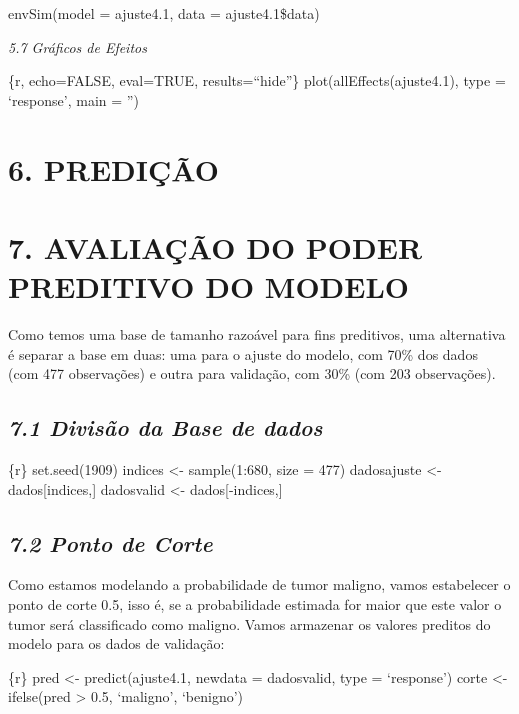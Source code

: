 \documentclass[]{article}
\begin{document}
envSim(model = ajuste4.1, data = ajuste4.1\$data)

\emph{5.7 Gráficos de Efeitos}

\{r, echo=FALSE, eval=TRUE, results=``hide''\}
plot(allEffects(ajuste4.1), type = `response', main = '')

\hypertarget{predicao}{%
\section{6. PREDIÇÃO}\label{predicao}}

\hypertarget{avaliacao-do-poder-preditivo-do-modelo}{%
\section{7. AVALIAÇÃO DO PODER PREDITIVO DO
MODELO}\label{avaliacao-do-poder-preditivo-do-modelo}}

Como temos uma base de tamanho razoável para fins preditivos, uma
alternativa é separar a base em duas: uma para o ajuste do modelo, com
70\% dos dados (com 477 observações) e outra para validação, com 30\%
(com 203 observações).

\hypertarget{divisao-da-base-de-dados}{%
\subsection{\texorpdfstring{\emph{7.1 Divisão da Base de
dados}}{7.1 Divisão da Base de dados}}\label{divisao-da-base-de-dados}}

\{r\} set.seed(1909) indices \textless{}- sample(1:680, size = 477)
dadosajuste \textless{}- dados{[}indices,{]} dadosvalid \textless{}-
dados{[}-indices,{]}

\hypertarget{ponto-de-corte}{%
\subsection{\texorpdfstring{\emph{7.2 Ponto de
Corte}}{7.2 Ponto de Corte}}\label{ponto-de-corte}}

Como estamos modelando a probabilidade de tumor maligno, vamos
estabelecer o ponto de corte 0.5, isso é, se a probabilidade estimada
for maior que este valor o tumor será classificado como maligno. Vamos
armazenar os valores preditos do modelo para os dados de validação:

\{r\} pred \textless{}- predict(ajuste4.1, newdata = dadosvalid, type =
`response') corte \textless{}- ifelse(pred \textgreater{} 0.5,
`maligno', `benigno')
\end{document}
